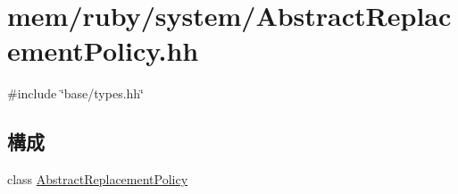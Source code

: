 \hypertarget{AbstractReplacementPolicy_8hh}{
\section{mem/ruby/system/AbstractReplacementPolicy.hh}
\label{AbstractReplacementPolicy_8hh}
}
{\ttfamily \#include \char`\"{}base/types.hh\char`\"{}}\par
\subsection*{構成}
\begin{DoxyCompactItemize}
\item 
class \hyperlink{classAbstractReplacementPolicy}{AbstractReplacementPolicy}
\end{DoxyCompactItemize}
